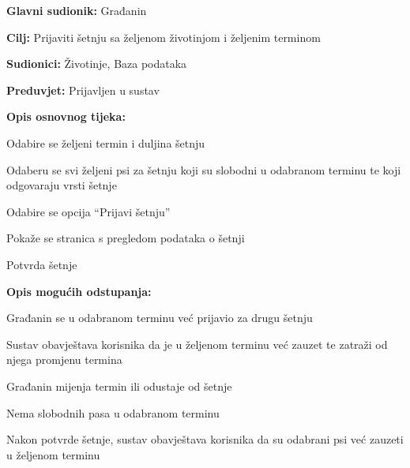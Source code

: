 					\noindent {}
					\begin{packed_item}
						
						\item \textbf{Glavni sudionik: } Građanin
						\item  \textbf{Cilj:} Prijaviti šetnju sa željenom životinjom i željenim terminom
						\item  \textbf{Sudionici:} Životinje, Baza podataka
						\item  \textbf{Preduvjet:} Prijavljen u sustav
						\item  \textbf{Opis osnovnog tijeka:}
						
						\item[] \begin{packed_enum}
							
							\item Odabire se željeni termin i duljina šetnju
							\item Odaberu se svi željeni psi za šetnju koji su slobodni u odabranom terminu te koji odgovaraju vrsti šetnje
							\item Odabire se opcija “Prijavi šetnju”
							\item Pokaže se stranica s pregledom podataka o šetnji
							\item Potvrda šetnje
							
						\end{packed_enum}
						
						\item  \textbf{Opis mogućih odstupanja:}
						
						\item[] \begin{packed_item}
							
							\item[1.a] Građanin se u odabranom terminu već prijavio za drugu šetnju
							\item[] \begin{packed_enum}
								
								\item Sustav obavještava korisnika da je u željenom terminu već zauzet te zatraži od njega promjenu termina
								\item Građanin mijenja termin ili odustaje od šetnje
								
								
							\end{packed_enum}
							\item[5.a] Nema slobodnih pasa u odabranom terminu
							\item[] \begin{packed_enum}
								
								\item Nakon potvrde šetnje, sustav obavještava korisnika da su odabrani psi već zauzeti u željenom terminu
							\end{packed_enum}
							
							
						\end{packed_item}
					\end{packed_item}
					
